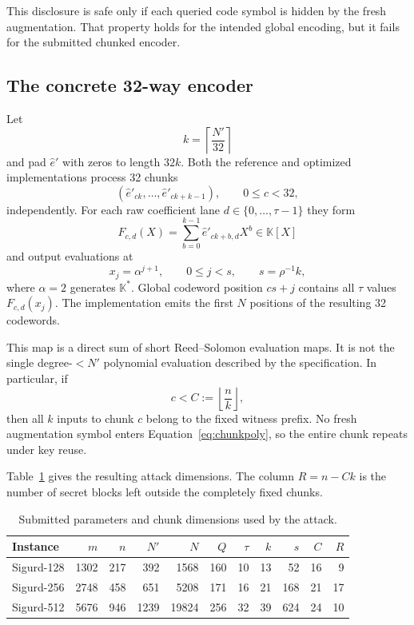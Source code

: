 \documentclass[11pt,a4paper]{article}
\newcommand{\K}{\mathbb{K}}
\begin{document}
This disclosure is safe only if each queried code symbol is hidden by the
fresh augmentation.  That property holds for the intended global encoding,
but it fails for the submitted chunked encoder.

\subsection{The concrete 32-way encoder}
\label{sec:encoder}

Let
\[
             k=\left\lceil\frac{N'}{32}\right\rceil
\]
and pad $\widehat e'$ with zeros to length $32k$.  Both the reference and
optimized implementations process 32 chunks
\[
       (\widehat e'_{ck},\ldots,\widehat e'_{ck+k-1}),
       \qquad 0\le c<32,
\]
independently.  For each raw coefficient lane $d\in\{0,\ldots,\tau-1\}$ they
form
\begin{equation}
       F_{c,d}(X)=\sum_{b=0}^{k-1}
                    \widehat e'_{ck+b,d}X^b\in\K[X]
\label{eq:chunkpoly}
\end{equation}
and output evaluations at
\[
                x_j=\alpha^{j+1},\qquad 0\le j<s,
                \qquad s=\rho^{-1}k,
\]
where $\alpha=2$ generates $\K^*$.  Global codeword position $cs+j$ contains
all $\tau$ values $F_{c,d}(x_j)$.  The implementation emits the first $N$
positions of the resulting 32 codewords.

This map is a direct sum of short Reed--Solomon evaluation maps.  It is not the
single degree-$<N'$ polynomial evaluation described by the specification.  In
particular, if
\[
                     c<C:=\left\lfloor\frac{n}{k}\right\rfloor,
\]
then all $k$ inputs to chunk $c$ belong to the fixed witness prefix.  No fresh
augmentation symbol enters Equation~\eqref{eq:chunkpoly}, so the entire chunk
repeats under key reuse.

Table~\ref{tab:params} gives the resulting attack dimensions.  The column
$R=n-Ck$ is the number of secret blocks left outside the completely fixed
chunks.

\begin{table}[ht]
\centering
\caption{Submitted parameters and chunk dimensions used by the attack.}
\label{tab:params}
\small
\begin{tabular}{@{}lrrrrrrrrrr@{}}
\toprule
Instance & $m$ & $n$ & $N'$ & $N$ & $Q$ & $\tau$ & $k$ & $s$ & $C$ & $R$ \\
\midrule
Sigurd-128 & 1302 & 217 & 392  & 1568  & 160 & 10 & 13 & 52  & 16 & 9  \\
Sigurd-256 & 2748 & 458 & 651  & 5208  & 171 & 16 & 21 & 168 & 21 & 17 \\
Sigurd-512 & 5676 & 946 & 1239 & 19824 & 256 & 32 & 39 & 624 & 24 & 10 \\
\bottomrule
\end{tabular}
\end{table}
\end{document}
